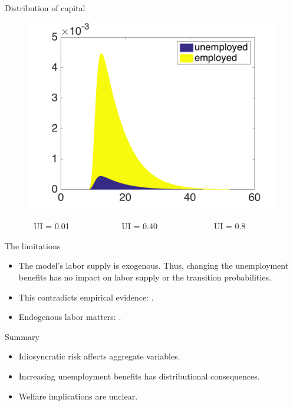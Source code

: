 \documentclass{beamer}
\begin{document}
\begin{frame}{Distribution of capital}
\begin{figure}[!tbp]
\begin{minipage}[b]{0.325\textwidth}
    \includegraphics[width=\textwidth]{distribution3}
  \end{minipage}
\end{figure}
\ \ \ \ \ \ \  UI = 0.01 \ \ \ \ \ \ \ \ \ \ \ \ UI = 0.40 \ \ \ \ \ \ \ \ \ \ \ \ \ UI = 0.8
\end{frame}


\begin{frame}{The limitations}
  
  \begin{itemize}
  
  \item {The model's labor supply is exogenous. Thus, changing the unemployment benefits has no impact on labor supply or the transition probabilities.
} 
  \item {This contradicts empirical evidence: \citeauthor{decker} \cite{decker}.
  }
  \item{Endogenous labor matters: \citeauthor{mukoyama} \cite{mukoyama}.
  }

  \end{itemize} 
\end{frame}


\begin{frame}{Summary}
  
  \begin{itemize}
  
  \item {
Idiosyncratic risk affects aggregate variables.
  }

    \item {
Increasing unemployment benefits has distributional consequences. 
  } 

\item {
Welfare implications are unclear.
}





  \end{itemize} 
\end{frame}
\end{document}
